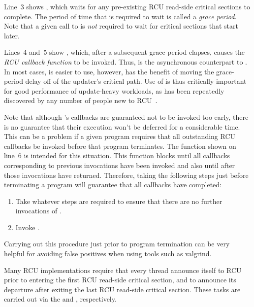 \documentclass[letterpaper,10pt]{article}
\begin{document}
Line~3 shows , which waits for any pre-existing
RCU read-side critical sections to complete.
The period of time that  is required to wait is
called a \emph{grace period}.
Note that a given call to  is \emph{not} required to
wait for critical sections that start later.

Lines~4 and~5 show , which, after a subsequent grace period
elapses, causes the  \emph{RCU callback function} to be invoked.
Thus,  is the asynchronous counterpart to
.
In most cases,  is easier to use, however, 
has the benefit of moving the grace-period delay off of the updater's
critical path.
Use of  is thus critically important for good performance of
update-heavy workloads, as has been repeatedly discovered by any number of
people new to RCU~\cite{PaulEMcKenney2015ReadMostly}.

Note that although 's callbacks are guaranteed not to be
invoked too early, there is no guarantee that their execution won't be
deferred for a considerable time.
This can be a problem if a given program requires that all outstanding
RCU callbacks be invoked before that program terminates.
The  function shown on line~6 is intended for this
situation.
This function blocks until all callbacks corresponding to previous
 invocations have been invoked and also until after
those invocations have returned.
Therefore, taking the following steps just before terminating a program
will guarantee that all callbacks have completed:

\begin{enumerate}
\item	Take whatever steps are required to ensure that there are no
	further invocations of .
\item	Invoke .
\end{enumerate}

Carrying out this procedure just prior to program termination can be very
helpful for avoiding false positives when using tools such as valgrind.

Many RCU implementations require that every thread announce itself to
RCU prior to entering the first RCU read-side critical section, and
to announce its departure after exiting the last RCU read-side
critical section.
These tasks are carried out via the  and
, respectively.
\end{document}
